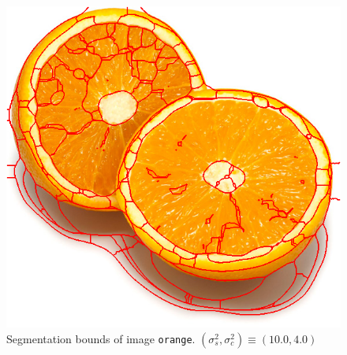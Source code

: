 {\begin{minipage}{\linewidth}
\begin{minipage}{0.45\linewidth}
\begin{figure}[H]
      \includegraphics[scale=0.4]{./images/02/orange/meanshift2_10_4.png}
      \caption{Segmentation bounds of image \texttt{orange}.
        $(\sigma_s^2, \sigma_c^2) \equiv (10.0, 4.0)$}
      \label{fig:02_orange2_10_4}
    \end{figure}
  \end{minipage}
\end{minipage}
}

